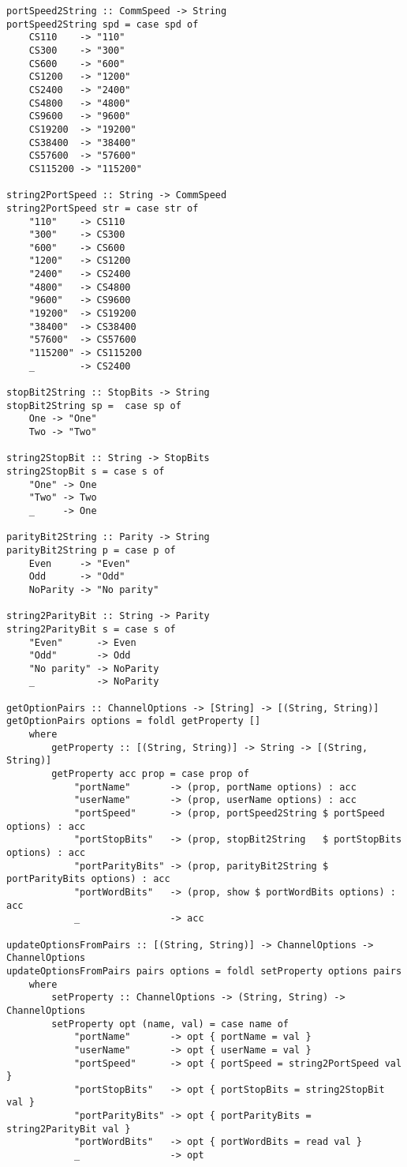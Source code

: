 \documentclass[russian,utf8,simple,emptystyle]{eskdtext}
\begin{document}
\begin{lstlisting}
portSpeed2String :: CommSpeed -> String 
portSpeed2String spd = case spd of
    CS110    -> "110"
    CS300    -> "300"
    CS600    -> "600"
    CS1200   -> "1200"
    CS2400   -> "2400"
    CS4800   -> "4800"
    CS9600   -> "9600"
    CS19200  -> "19200"
    CS38400  -> "38400"
    CS57600  -> "57600"
    CS115200 -> "115200"

string2PortSpeed :: String -> CommSpeed
string2PortSpeed str = case str of
    "110"    -> CS110
    "300"    -> CS300
    "600"    -> CS600
    "1200"   -> CS1200
    "2400"   -> CS2400
    "4800"   -> CS4800
    "9600"   -> CS9600
    "19200"  -> CS19200
    "38400"  -> CS38400
    "57600"  -> CS57600
    "115200" -> CS115200
    _        -> CS2400

stopBit2String :: StopBits -> String 
stopBit2String sp =  case sp of 
    One -> "One" 
    Two -> "Two"

string2StopBit :: String -> StopBits 
string2StopBit s = case s of 
    "One" -> One
    "Two" -> Two
    _     -> One

parityBit2String :: Parity -> String 
parityBit2String p = case p of
    Even     -> "Even"
    Odd      -> "Odd"
    NoParity -> "No parity"

string2ParityBit :: String -> Parity 
string2ParityBit s = case s of
    "Even"      -> Even 
    "Odd"       -> Odd
    "No parity" -> NoParity
    _           -> NoParity

getOptionPairs :: ChannelOptions -> [String] -> [(String, String)]
getOptionPairs options = foldl getProperty []
    where
        getProperty :: [(String, String)] -> String -> [(String, String)]
        getProperty acc prop = case prop of 
            "portName"       -> (prop, portName options) : acc
            "userName"       -> (prop, userName options) : acc
            "portSpeed"      -> (prop, portSpeed2String $ portSpeed      options) : acc
            "portStopBits"   -> (prop, stopBit2String   $ portStopBits   options) : acc
            "portParityBits" -> (prop, parityBit2String $ portParityBits options) : acc
            "portWordBits"   -> (prop, show $ portWordBits options) : acc
            _                -> acc    

updateOptionsFromPairs :: [(String, String)] -> ChannelOptions -> ChannelOptions
updateOptionsFromPairs pairs options = foldl setProperty options pairs 
    where
        setProperty :: ChannelOptions -> (String, String) -> ChannelOptions
        setProperty opt (name, val) = case name of 
            "portName"       -> opt { portName = val }
            "userName"       -> opt { userName = val }
            "portSpeed"      -> opt { portSpeed = string2PortSpeed val }
            "portStopBits"   -> opt { portStopBits = string2StopBit val }
            "portParityBits" -> opt { portParityBits = string2ParityBit val }
            "portWordBits"   -> opt { portWordBits = read val }
            _                -> opt



\end{lstlisting}
\end{document}
